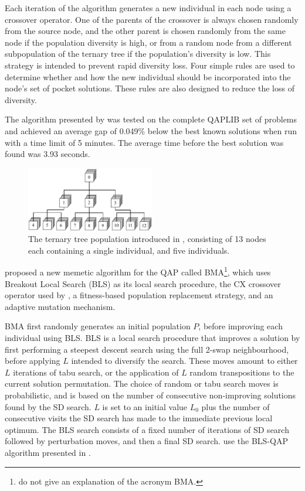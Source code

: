 {	Each iteration of the algorithm generates a new individual in each node using a crossover operator. One of the parents of the crossover is always chosen randomly from the source node, and the other parent is chosen randomly from the same node if the population diversity is high, or from a random node from a different subpopulation of the ternary tree if the population's diversity is low. This strategy is intended to prevent rapid diversity loss. Four simple rules are used to determine whether and how the new individual should be incorporated into the node's set of pocket solutions. These rules are also designed to reduce the loss of diversity.

	The algorithm presented by \citeauthor{Harris:2015kw} was tested on the complete QAPLIB set of problems and achieved an average gap of 0.049\% below the best known solutions when run with a time limit of 5 minutes. The average time before the best solution was found was 3.93 seconds.

	\begin{figure}
		\centering
		\includegraphics[width=0.5\textwidth]{resources/ternary-tree.pdf}%
		\caption{The ternary tree population introduced in \citet{Inostroza:2008md}, consisting of 13 nodes each containing a single  individual, and five  individuals.}
		\label{fig:ternary-tree}
	\end{figure}



	\citet{Benlic:2015gp} proposed a new memetic algorithm for the QAP called BMA\footnote{\citeauthor{Benlic:2015gp} do not give an explanation of the acronym BMA.}, which uses Breakout Local Search (BLS) as its local search procedure, the CX crossover operator used by \citet{Merz:2000ek}, a fitness-based population replacement strategy, and an adaptive mutation mechanism.

	BMA first randomly generates an initial population \(P\), before improving each individual using BLS.
	BLS is a local search procedure that improves a solution by first performing a steepest descent search using the full 2-swap neighbourhood, before applying \(L\)  intended to diversify the search. These moves amount to either \(L\) iterations of tabu search, or the application of \(L\) random transpositions to the current solution permutation. The choice of random or tabu search moves is probabilistic, and is based on the number of consecutive non-improving solutions found by the SD search. \(L\) is set to an initial value \(L_0\) plus the number of consecutive visits the SD search has made to the immediate previous local optimum.
	The BLS search consists of a fixed number of iterations of SD search followed by perturbation moves, and then a final SD search.
	\citeauthor{Benlic:2015gp} use the BLS-QAP algorithm presented in \citet{Benlic:2013gi}.

}
